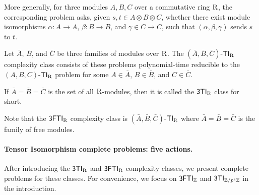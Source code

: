 More generally, for three modules $A, B, C$ over a commutative ring $\mathrm{R}$, the corresponding \TIlong problem asks, given $s, t\in A\otimes B\otimes C$, whether there exist module isomorphisms $\alpha:A\to A$, $\beta:B\to B$, and $\gamma\in C\to C$, such that $(\alpha, \beta, \gamma)$ sends $s$ to $t$. 
\begin{definition}\label{def:TI}
Let $\bar A$, $\bar B$, and $\bar C$ be three families of modules over $\mathrm{R}$. The $(\bar A, \bar B, \bar C)$-${\sf TI}_{\mathrm{R}}$ complexity class consists of these problems polynomial-time reducible to the $(A, B, C)$-${\sf TI}_{\mathrm{R}}$ problem for some $A\in \bar A$, $B\in \bar B$, and $C\in \bar C$.

If $\bar A=\bar B=\bar C$ is the set of all $\mathrm{R}$-modules, then it is called the ${\sf 3TI}_{\mathrm{R}}$ class for short. 
\end{definition}

Note that the ${\sf 3FTI}_{\mathrm{R}}$ complexity class is $(\bar A, \bar B, \bar C)$-${\sf TI}_{\mathrm{R}}$ where $\bar A=\bar B=\bar C$ is the family of free modules. 

\paragraph{Tensor Isomorphism complete problems: five actions.} After introducing the ${\sf 3TI}_{\mathrm{R}}$ and ${\sf 3FTI}_{\mathrm{R}}$ complexity classes, we present complete problems for these classes. For convenience, we focus on ${\sf 3FTI}_{\mathbb{Z}}$ and ${\sf 3TI}_{\mathbb{Z}/p^e\mathbb{Z}}$ in the introduction.

